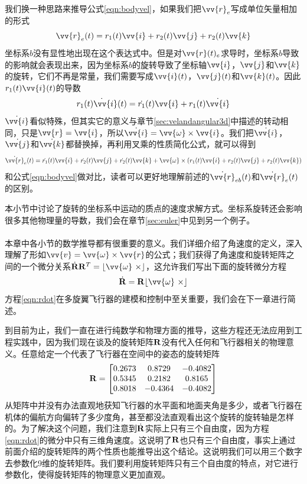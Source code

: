 \documentclass[11pt]{article}
\begin{document}
我们换一种思路来推导公式\ref{eqn:bodyvel}，如果我们把$\vv{r}_e$写成单位矢量相加的形式
$$
\vv{r}_e(t) = r_1(t)\vv{i}+r_2(t)\vv{j}+r_2(t)\vv{k}
$$
坐标系$b$没有显性地出现在这个表达式中。但是对$\vv{r}(t)_e$求导时，坐标系$b$导致的影响就会表现出来，因为坐标系$b$的旋转导致了坐标轴$\vv{i}$，$\vv{j}$和$\vv{k}$的旋转，它们不再是常量，我们需要写成$\vv{i}(t)$，$\vv{j}(t)$和$\vv{k}(t)$。因此$r_1(t)\vv{i}(t)$的导数
$$
\dot{r_1(t)\vv{i}(t)} = \dot{r_1}(t)\vv{i} + r_1(t)\dot{\vv{i}}
$$
$\dot{\vv{i}}$看似特殊，但其实它的意义与章节\ref{sec:velandangular3d}中描述的转动相同，只是$\vv{r} = \vv{i}$，所以$\dot{\vv{i}} = \vv{\omega} \times \vv{i}$。我们把$\dot{\vv{i}}$，$\dot{\vv{j}}$和$\dot{\vv{k}}$都替换掉，再利用叉乘的性质简化公式，就可以得到
$$
\dot{\vv{r}}_e(t) = \dot{r_1}(t)\vv{i}+\dot{r_2}(t)\vv{j}+\dot{r_2}(t)\vv{k} + \vv{\omega} \times (r_1(t)\vv{i}+r_2(t)\vv{j}+r_2(t)\vv{k}) 
$$
和公式\ref{eqn:bodyvel}做对比，读者可以更好地理解前述的$\dot{\vv{r}}_{eb}(t)$和$\dot{\vv{r}}_{e}(t)$的区别。

本小节中讨论了旋转的坐标系中运动的质点的速度求解方式。坐标系旋转还会影响很多其他物理量的导数，我们会在章节\ref{sec:euler}中见到另一个例子。
\ \\
\ \\

本章中各小节的数学推导都有很重要的意义。我们详细介绍了角速度的定义，深入理解了形如$\vv{v} = \vv{\omega} \times \vv{r}$的公式；我们获得了角速度和旋转矩阵之间的一个微分关系$\dot{{\bf R}}{\bf R}^T = \lfloor \vv{\omega} \ \times \rfloor$，这允许我们写出下面的旋转微分方程
\begin{equation}\label{eqn:rdot}
\dot{{\bf R}} = {\bf R}\lfloor \vv{\omega} \ \times \rfloor
\end{equation}
方程\ref{eqn:rdot}在多旋翼飞行器的建模和控制中至关重要，我们会在下一章进行简述。

到目前为止，我们一直在进行纯数学和物理方面的推导，这些方程还无法应用到工程实践中，因为我们现在谈及的旋转矩阵${\bf R}$没有代入任何和飞行器相关的物理意义。任意给定一个代表了飞行器在空间中的姿态的旋转矩阵
$$
{\bf R} = 
\begin{bmatrix}
0.2673 & 0.8729 & -0.4082 \\
0.5345 & 0.2182 & 0.8165 \\
0.8018 & -0.4364 & -0.4082
\end{bmatrix}
$$
从矩阵中并没有办法直观地获知飞行器的水平面和地面夹角是多少，或者飞行器在机体的偏航方向偏转了多少度角，甚至都没法直观看出这个旋转的旋转轴是怎样的。为了解决这个问题，我们注意到$\dot{{\bf R}}$实际上只有三个自由度，因为方程\ref{eqn:rdot}的微分中只有三维角速度。这说明了${\bf R}$也只有三个自由度，事实上通过前面介绍的旋转矩阵的两个性质也能推导出这个结论。这说明我们可以用三个数字去参数化9维的旋转矩阵。我们要利用旋转矩阵只有三个自由度的特点，对它进行参数化，使得旋转矩阵的物理意义更加直观。
\end{document}
